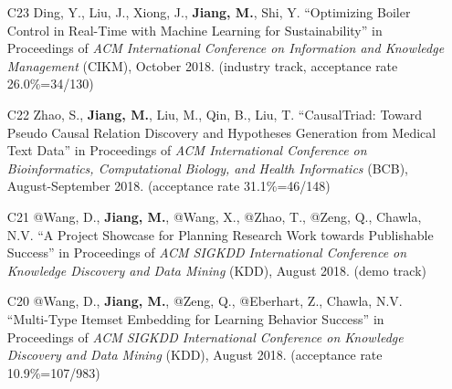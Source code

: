 \documentclass[10pt]{article}
\newenvironment{myindentpar}[1]%
{\begin{list}{}%
         {\setlength{\leftmargin}{#1}}%
         \item[]%
}
{\end{list}}
\newcounter{list}
\begin{document}
\begin{myindentpar}{0.00cm}
\begin{enumerate}[leftmargin=.5cm]
\vspace{-0.1cm}

\item[C23] Ding, Y., Liu, J., Xiong, J., \textbf{Jiang, M.}, Shi, Y. ``Optimizing Boiler Control in Real-Time with Machine Learning for Sustainability'' in Proceedings of \emph{ACM International Conference on Information and Knowledge Management} (CIKM), October 2018. (industry track, acceptance rate 26.0\%=34/130)

\vspace{-0.1cm}

\item[C22] Zhao, S., \textbf{Jiang, M.}, Liu, M., Qin, B., Liu, T. ``CausalTriad: Toward Pseudo Causal Relation Discovery and Hypotheses Generation from Medical Text Data'' in Proceedings of \emph{ACM International Conference on Bioinformatics, Computational Biology, and Health Informatics} (BCB), August-September 2018. (acceptance rate 31.1\%=46/148)

\vspace{-0.1cm}

\item[C21] @Wang, D., \textbf{Jiang, M.}, @Wang, X., @Zhao, T., @Zeng, Q., Chawla, N.V. ``A Project Showcase for Planning Research Work towards Publishable Success'' in Proceedings of \emph{ACM SIGKDD International Conference on Knowledge Discovery and Data Mining} (KDD), August 2018. (demo track)

\vspace{-0.1cm}

\item[C20] @Wang, D., \textbf{Jiang, M.}, @Zeng, Q., @Eberhart, Z., Chawla, N.V. ``Multi-Type Itemset Embedding for Learning Behavior Success'' in Proceedings of \emph{ACM SIGKDD International Conference on Knowledge Discovery and Data Mining} (KDD), August 2018. (acceptance rate 10.9\%=107/983)


\end{enumerate}
\end{myindentpar}
\end{document}

